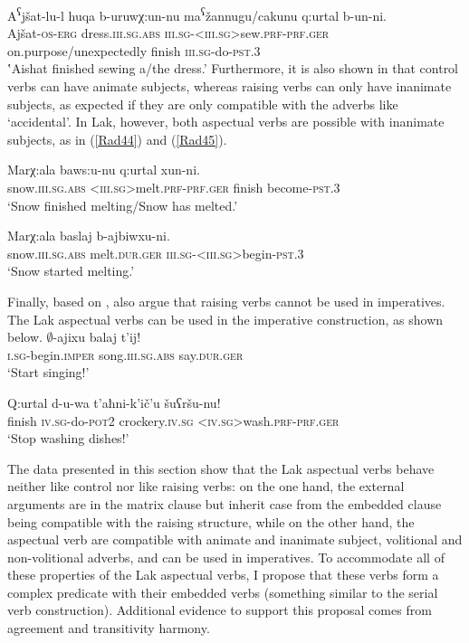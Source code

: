 \documentclass[output=paper]{langscibook}
\begin{document}
\ea\label{Rad43}
\gll A\textsuperscript{ʕ}jšat-lu-l huqa b-uruwχ:un-nu ma\textsuperscript{ʕ}žannugu/cakunu q:urtal b-un-ni.\\
Ajšat-\textsc{os-erg} 	dress.\textsc{iii.sg.abs} \textsc{iii.sg-<iii.sg>}sew.\textsc{prf-prf.ger} on.purpose/unexpectedly	finish 	\textsc{iii.sg}-do-\textsc{pst.3}\\	
\glt ‛Aishat finished sewing a/the dress.’
\z 
Furthermore, it is also shown in \citet{PolinskyPotsdam2002} that control verbs can have animate subjects, whereas raising verbs can only have inanimate subjects, as expected if they are only compatible with the adverbs like ‘accidental’. In Lak, however, both aspectual verbs are possible with inanimate subjects, as in (\ref{Rad44}) and (\ref{Rad45}).   

\ea\label{Rad44}
\gll Marχ:ala baws:u-nu q:urtal xun-ni.\\
snow.\textsc{iii.sg.abs} \textsc{<iii.sg>}melt.\textsc{prf-prf.ger} finish become-\textsc{pst.3}\\
\glt ‘Snow finished melting/Snow has melted.’
\z 

\ea\label{Rad45}
\gll Marχ:ala baslaj b-ajbiwxu-ni.\\
snow.\textsc{iii.sg.abs} melt.\textsc{dur.ger} \textsc{iii.sg-<iii.sg>}begin-\textsc{pst.3}\\
\glt ‘Snow started melting.’
\z 

Finally, based on \citet{Farkas1988}, \cite{PolinskyPotsdam2002} also argue that raising verbs cannot be used in imperatives. The Lak aspectual verbs can be used in the imperative construction, as shown below.
\ea\label{Rad46}
\gll $∅$-ajixu balaj t’ij!\\
\textsc{i.sg}-begin.\textsc{imper} song.\textsc{iii.sg.abs} say.\textsc{dur.ger}\\
\glt ‘Start singing!’
\z 

\ea\label{Rad47}
\gll Q:urtal d-u-wa t’aħni-k’ič’u šuʕršu-nu!\\
finish \textsc{iv.sg}-do-\textsc{pot2}	crockery.\textsc{iv.sg}	\textsc{<iv.sg>}wash.\textsc{prf-prf.ger}\\
\glt ‘Stop washing dishes!’
\z 

The data presented in this section show that the Lak aspectual verbs behave neither like control nor like raising verbs: on the one hand, the external arguments are in the matrix clause but inherit case from the embedded clause being compatible with the raising structure, while on the other hand, the aspectual verb are compatible with animate and inanimate subject, volitional and non-volitional adverbs, and can be used in imperatives. To accommodate all of these properties of the Lak aspectual verbs, I propose that these verbs form a complex predicate with their embedded verbs (something similar to the serial verb construction). Additional evidence to support this proposal comes from agreement and transitivity harmony.
\end{document}
